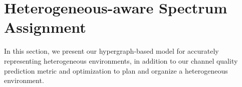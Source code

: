 

\section{Heterogeneous-aware Spectrum Assignment}

In this section, we present our hypergraph-based model for accurately representing heterogeneous environments, in addition to our channel quality prediction metric and optimization to plan and organize a heterogeneous environment.





